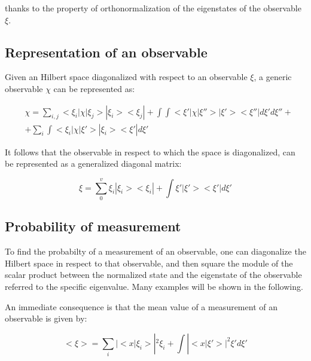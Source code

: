 \documentclass{article}
\begin{document}
thanks to the property of orthonormalization of the eigenstates of the observable $\xi$.

\subsection{Representation of an observable}

\begin{tcolorbox}[colframe=gray!50, colback=gray!10, coltitle=black, title=Observable Representation]
    Given an Hilbert space diagonalized with respect to an observable $\xi$, a generic observable $\chi$ can be represented as:

    \begin{equation}
        \begin{aligned}
             & \chi= \sum_{i,j} <\xi_i|\chi|\xi_j>|\xi_i><\xi_j|+ \int\int <\xi'|\chi|\xi''>|\xi'><\xi''| d\xi'd\xi'' + \\
             & + \sum_i\int <\xi_i|\chi|\xi'>|\xi_i><\xi'|d\xi'
        \end{aligned}
    \end{equation}

\end{tcolorbox}

It follows that the observable in respect to which the space is diagonalized, can be represented as a generalized diagonal matrix:

\begin{equation}
    \xi = \sum_{0}^{v} \xi_i|\xi_i><\xi_i|+ \int \xi'|\xi'><\xi'|d\xi'
\end{equation}

\subsection{Probability of measurement}

To find the probabilty of a measurement of an observable, one can diagonalize the Hilbert space in respect to that observable,
and then square the module of the scalar product between the normalized state and the eigenstate of the observable referred to the specific eigenvalue.
Many examples will be shown in the following.

An immediate consequence is that the mean value of a measurement of an observable is given by:

\begin{tcolorbox}[colframe=gray!50, colback=gray!10, coltitle=black, title=Mean Value of an Observable]
    \begin{equation}
        <\xi> = \sum_i |<x|\xi_i>|^2 \xi_i + \int |<x|\xi'>|^2 \xi' d\xi'
    \end{equation}
\end{tcolorbox}
\end{document}
